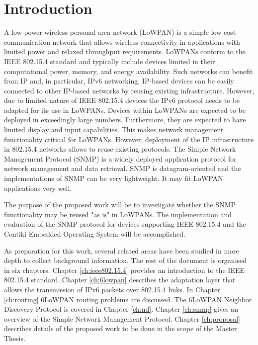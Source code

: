 \documentclass[12pt, titlepage, a4paper]{report}
\begin{document}
\chapter{Introduction}
A low-power wireless personal area network (LoWPAN) is a simple low cost communication network that allows wireless connectivity in applications with limited power and relaxed throughput requirements. LoWPANs conform to the IEEE 802.15.4 standard \cite{ieee802.15.4} and typically include devices limited in their computational power, memory, and energy availability. Such networks can benefit from IP and, in particular, IPv6 networking. IP-based devices can be easily connected to other IP-based networks by reusing existing infrastructure. However, due to limited nature of IEEE 802.15.4 devices the IPv6 protocol \cite{rfc2460} needs to be adapted for its use in LoWPANs.  Devices within LoWPANs are expected to be deployed in exceedingly large numbers. Furthermore, they are expected to have limited display and input capabilities. This makes network management functionality critical for LoWPANs. However, deployment of the IP infrastructure in 802.15.4 networks allows to reuse existing protocols. The Simple Network Management Protocol (SNMP) is a widely deployed application protocol for network management and data retrieval. SNMP is datagram-oriented and the implementations of SNMP can be very lightweight.  It may fit LoWPAN applications very well.

The purpose of the proposed work will be to investigate whether the SNMP functionality may be reused "as is" in LoWPANs. The implementation and evaluation of the SNMP protocol for devices supporting IEEE 802.15.4 and the Contiki Embedded Operating System \cite{contiki} will be accomplished. 

As preparation for this work, several related areas have been studied in more depth to collect background information. The rest of the document is organised in six chapters. Chapter \ref{ch:ieee802.15.4} provides an introduction to the IEEE 802.15.4 standard. Chapter \ref{ch:6lowpan} describes the adaptation layer that allows the transmission of IPv6 packets over 802.15.4 links. In Chapter \ref{ch:routing} 6LoWPAN routing problems are discussed. The 6LoWPAN Neighbor Discovery Protocol is covered in Chapter \ref{ch:nd}. Chapter \ref{ch:snmp} gives an overview of the Simple Network Management Protocol. Chapter \ref{ch:proposal} describes details of the proposed work to be done in the scope of the Master Thesis.
\end{document}
